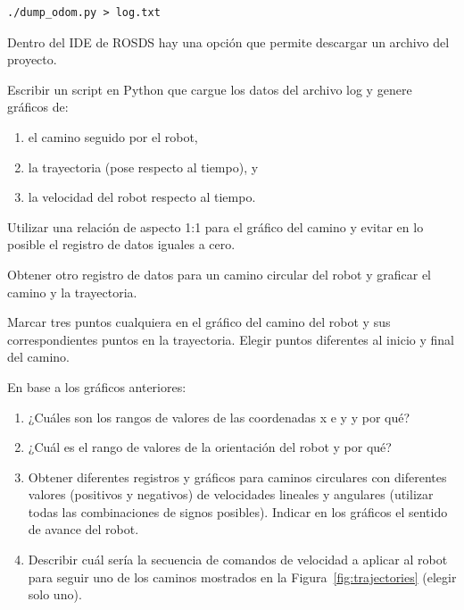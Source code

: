 \documentclass[tp]{lcc}
\begin{document}
\begin{lstlisting}[style=bash] 
./dump_odom.py > log.txt
\end{lstlisting}

Dentro del IDE de ROSDS hay una opción que permite descargar un archivo del proyecto.

\ejercicio Escribir un script en Python que cargue los datos del archivo log y genere gráficos de:
\begin{enumerate}
	\item el camino seguido por el robot,
	\item la trayectoria (pose respecto al tiempo), y
	\item la velocidad del robot respecto al tiempo.
\end{enumerate} 

\nota Utilizar una relación de aspecto 1:1 para el gráfico del camino y evitar en lo posible el registro de datos iguales a cero.

\ejercicio Obtener otro registro de datos para un camino circular del robot y graficar el camino y la trayectoria.

\ejercicio Marcar tres puntos cualquiera en el gráfico del camino del robot y sus correspondientes puntos en la trayectoria. Elegir puntos diferentes al inicio y final del camino.


En base a los gráficos anteriores:

\begin{enumerate}

\item ¿Cuáles son los rangos de valores de las coordenadas x e y y por qué?

\item  ¿Cuál es el rango de valores de la orientación del robot y por qué?

\item Obtener diferentes registros y gráficos para caminos circulares con diferentes valores (positivos y negativos) de velocidades lineales y angulares (utilizar todas las combinaciones de signos posibles). Indicar en los gráficos el sentido de avance del robot.

\item Describir cuál sería la secuencia de comandos de velocidad a aplicar al robot para seguir uno de los caminos mostrados en la Figura~\ref{fig:trajectories} (elegir solo uno).

\end{enumerate}
\end{document}
